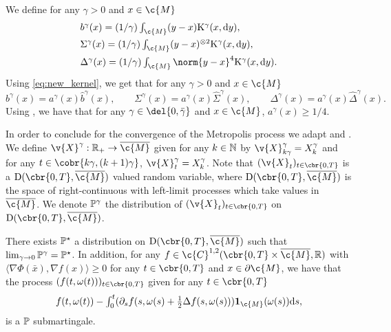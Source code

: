 We define for any $\gamma > 0$ and $x \in \c{M}$ \begin{align}  & \textstyle b^\gamma(x) = (1/\gamma) \int_{\c{M}} (y - x) \Kker^\gamma(x, \mathrm{d} y) , \\ &\textstyle \Sigma^\gamma(x) = (1/\gamma)\int_{\c{M}} (y - x)^{\otimes 2} \Kker^\gamma(x, \mathrm{d} y) , \\ &\textstyle \Delta^\gamma(x) = (1/\gamma)\int_{\c{M}} \norm{y - x}^4 \Kker^\gamma(x, \mathrm{d} y) .
\end{align}
Using \eqref{eq:new_kernel}, we get that for any $\gamma >0$ and $x \in \c{M}$ \begin{equation} \label{eq:relation_coeff} b^\gamma(x) = a^\gamma(x) \hat{b}^\gamma(x) , \qquad \Sigma^\gamma(x) = a^\gamma(x) \hat{\Sigma}^\gamma(x) , \qquad \Delta^\gamma(x) = a^\gamma(x) \hat{\Delta}^\gamma(x) .
\end{equation}
Using , we have that for any $\gamma \in \del{0, \bar{\gamma}}$ and $x \in \c{M}$, $a^\gamma(x) \geq 1/4$.

In order to conclude for the convergence of the Metropolis process we adapt  and .
We define $\v{X}^\gamma : \R_+ \to \cl{\c{M}}$ given for any $k \in \mathbb{N}$ by $\v{X}^\gamma_{k\gamma} = X_k^\gamma$ and for any $t \in \cobr{k\gamma, (k+1)\gamma}$, $\v{X}^\gamma_t = X_{k}^\gamma$.
Note that $(\v{X}_t)_{t \in \cbr{0,T}}$ is a $\mathrm{D}(\cbr{0,T}, \cl{\c{M}})$ valued random variable, where $\mathrm{D}(\cbr{0,T}, \cl{\c{M}})$ is the space of right-continuous with left-limit processes which take values in $\cl{\c{M}}$.
We denote $\bb{P}^\gamma$ the distribution of $(\v{X}_t)_{t \in \cbr{0,T}}$ on $\mathrm{D}(\cbr{0,T}, \cl{\c{M}})$.

\begin{theorem}
	\label{thm:martingale-problem-lazy}
	There exists $\bb{P}^\star$ a distribution on $\mathrm{D}(\cbr{0,T}, \cl{\c{M}})$ such that $\lim_{\gamma \to 0} \bb{P}^\gamma = \bb{P}^\star$.
	In addition, for any $f \in \c{C}^{1,2}(\cbr{0,T} \times \cl{\c{M}}, \R)$ with $\langle \nabla \Phi(\bar{x}), \nabla f(x) \rangle \geq 0$ for any $t \in \cbr{0,T}$ and $x \in \partial \c{M}$, we have that the process $(f(t, \omega(t)))_{t \in \cbr{0,T}}$ given for any $t \in \cbr{0,T}$ \begin{equation} \textstyle f(t, \omega(t)) - \int_0^t (\partial_s f(s, \omega(s) + \tfrac{1}{2} \Delta f(s, \omega(s))) \bm{1}_{\c{M}}(\omega(s)) \mathrm{d} s , \end{equation} is a $\bb{P}$ submartingale.
\end{theorem}

